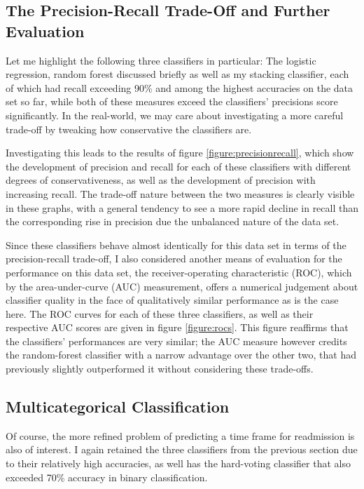 \documentclass[10pt, twoside, a4paper]{article}
\begin{document}
	\subsection{The Precision-Recall Trade-Off and Further Evaluation}
	Let me 
	highlight the following three classifiers in particular: The 
	logistic regression, random forest discussed briefly as well as my stacking classifier, 
	each of which had recall exceeding 90\% and among the highest 
	accuracies on the data set so far, while both of these measures 
	exceed the classifiers' precisions score significantly. In the real-world, we may 
	care about investigating a more careful trade-off by tweaking how conservative the 
	classifiers are. 

	Investigating this leads to the results of 
	figure \ref{figure:precisionrecall}, which show the development of precision and recall 
	for each of these classifiers with different degrees of conservativeness, as well as the 
	development of precision with increasing recall. The trade-off nature between the two 
	measures is clearly visible in these graphs, with a general tendency to see a more rapid 
	decline in recall than the corresponding rise in precision due 
	the unbalanced nature of the data set. 
	
	Since these classifiers behave almost identically for this data set in 
	terms of the precision-recall trade-off, I also considered another means of evaluation for 
	the performance on this data set, the receiver-operating characteristic (ROC), which by the 
	area-under-curve (AUC) measurement, offers a numerical 
	judgement about classifier quality in the face of qualitatively similar performance as is the case 
	here. The ROC curves for each of these three classifiers, as well as their respective AUC
	scores are given in figure \ref{figure:rocs}. This figure reaffirms that the classifiers'
	performances are very similar; the AUC measure however credits the random-forest 
	classifier with a narrow advantage over the other two, that had previously 
	slightly outperformed it without considering these trade-offs.

	\subsection{Multicategorical Classification}
	Of course, the more refined problem of predicting a time frame for 
	readmission is also of interest.  I again retained the three 
	classifiers from 
	the previous section due to their relatively high accuracies,
	as well has the hard-voting classifier that also exceeded 70\% accuracy in binary 
	classification. 
	
\end{document}

